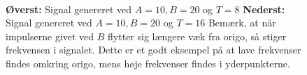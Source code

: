\documentclass[a4paper, 10pt, danish, final]{article}
\begin{document}
\begin{figure}[!h]
    \centering
    \\
    \caption[]{
    \textbf{Øverst:} Signal genereret ved $A = 10, B = 20$ og $T = 8$
    \textbf{Nederst:} Signal genereret ved $A = 10, B = 20$ og $T = 16$
    Bemærk, at når impulserne givet ved $B$ flytter sig længere væk fra
    origo, så stiger frekvensen i signalet. Dette er et godt eksempel på
    at lave frekvenser findes omkring origo, mens høje frekvenser findes
    i yderpunkterne.
    }
    \label{signal_10_20_8_16}
\end{figure}
\end{document}
